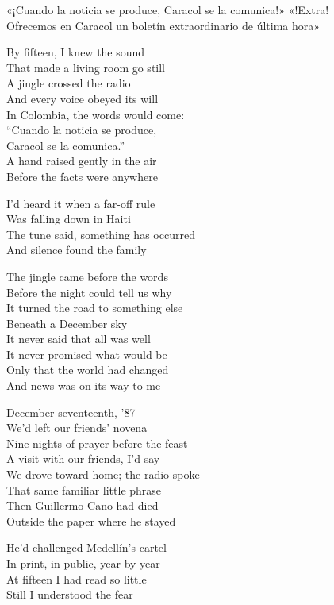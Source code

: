 \begin{lyrics}
«¡Cuando la noticia se produce, Caracol se la comunica!»
«!Extra!\\
Ofrecemos en Caracol un boletín extraordinario de última hora»

By fifteen, I knew the sound\\
That made a living room go still\\
A jingle crossed the radio\\
And every voice obeyed its will\\
In Colombia, the words would come:\\
“Cuando la noticia se produce,\\
Caracol se la comunica.”\\
A hand raised gently in the air\\
Before the facts were anywhere

I’d heard it when a far-off rule\\
Was falling down in Haiti\\
The tune said, something has occurred\\
And silence found the family

The jingle came before the words\\
Before the night could tell us why\\
It turned the road to something else\\
Beneath a December sky\\
It never said that all was well\\
It never promised what would be\\
Only that the world had changed\\
And news was on its way to me

December seventeenth, ’87\\
We’d left our friends’ novena\\
Nine nights of prayer before the feast\\
A visit with our friends, I’d say\\
We drove toward home; the radio spoke\\
That same familiar little phrase\\
Then Guillermo Cano had died\\
Outside the paper where he stayed

He’d challenged Medellín’s cartel\\
In print, in public, year by year\\
At fifteen I had read so little\\
Still I understood the fear


\end{lyrics}
